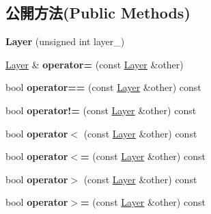 \subsection*{公開方法(Public Methods)}
\begin{DoxyCompactItemize}
\item 
{\bfseries Layer} (unsigned int layer\+\_\+)\hypertarget{class_magnum_1_1_layer_a9536e86d2c19f61711a7b743290cb090}{}\label{class_magnum_1_1_layer_a9536e86d2c19f61711a7b743290cb090}

\item 
\hyperlink{class_magnum_1_1_layer}{Layer} \& {\bfseries operator=} (const \hyperlink{class_magnum_1_1_layer}{Layer} \&other)\hypertarget{class_magnum_1_1_layer_a87d3ea2ca016510f11f604ecbb1a5fb2}{}\label{class_magnum_1_1_layer_a87d3ea2ca016510f11f604ecbb1a5fb2}

\item 
bool {\bfseries operator==} (const \hyperlink{class_magnum_1_1_layer}{Layer} \&other) const \hypertarget{class_magnum_1_1_layer_a8e92c4050c65f0716056ead2596b267a}{}\label{class_magnum_1_1_layer_a8e92c4050c65f0716056ead2596b267a}

\item 
bool {\bfseries operator!=} (const \hyperlink{class_magnum_1_1_layer}{Layer} \&other) const \hypertarget{class_magnum_1_1_layer_a291ed0962dcbfc3d9bb61a7f73032afd}{}\label{class_magnum_1_1_layer_a291ed0962dcbfc3d9bb61a7f73032afd}

\item 
bool {\bfseries operator$<$} (const \hyperlink{class_magnum_1_1_layer}{Layer} \&other) const \hypertarget{class_magnum_1_1_layer_a852fd88c0dc690b456c9c48e4dfa9de5}{}\label{class_magnum_1_1_layer_a852fd88c0dc690b456c9c48e4dfa9de5}

\item 
bool {\bfseries operator$<$=} (const \hyperlink{class_magnum_1_1_layer}{Layer} \&other) const \hypertarget{class_magnum_1_1_layer_a6f28ee4c27eb68b5d2b8f91b8af15499}{}\label{class_magnum_1_1_layer_a6f28ee4c27eb68b5d2b8f91b8af15499}

\item 
bool {\bfseries operator$>$} (const \hyperlink{class_magnum_1_1_layer}{Layer} \&other) const \hypertarget{class_magnum_1_1_layer_aeb9925ef7a43eee5e0477a9596946a26}{}\label{class_magnum_1_1_layer_aeb9925ef7a43eee5e0477a9596946a26}

\item 
bool {\bfseries operator$>$=} (const \hyperlink{class_magnum_1_1_layer}{Layer} \&other) const \hypertarget{class_magnum_1_1_layer_a0bd629665d6e657d52702fe2c45e73d1}{}\label{class_magnum_1_1_layer_a0bd629665d6e657d52702fe2c45e73d1}


\end{DoxyCompactItemize}

